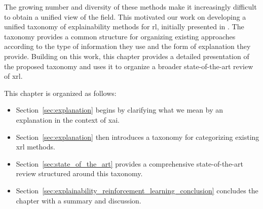 

The growing number and diversity of these methods make it increasingly difficult to obtain a unified view of the field.
This motivated our work on developing a unified taxonomy of explainability methods for \gls{rl}, initially presented in \parencite{alaarabiou:hal-04685607}.
The taxonomy provides a common structure for organizing existing approaches according to the type of information they use and the form of explanation they provide.
Building on this work, this chapter provides a detailed presentation of the proposed taxonomy and uses it to organize a broader state-of-the-art review of \gls{xrl}.

This chapter is organized as follows:
\begin{itemize}
    \item Section~\ref{sec:explanation} begins by clarifying what we mean by an explanation in the context of \gls{xai}.
    \item Section~\ref{sec:explanation} then introduces a taxonomy for categorizing existing \gls{xrl} methods.
    \item Section~\ref{sec:state_of_the_art} provides a comprehensive state-of-the-art review structured around this taxonomy.
    \item Section~\ref{sec:explainability_reinforcement_learning_conclusion} concludes the chapter with a summary and discussion.
\end{itemize}




